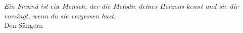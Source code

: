 \thispagestyle{empty}
\begin{center}
 \emph{Ein Freund ist ein Mensch, der die Melodie deines Herzens kennt und sie
       dir vorsingt, wenn du sie vergessen hast.}\\
 Den Sängern
\end{center}
